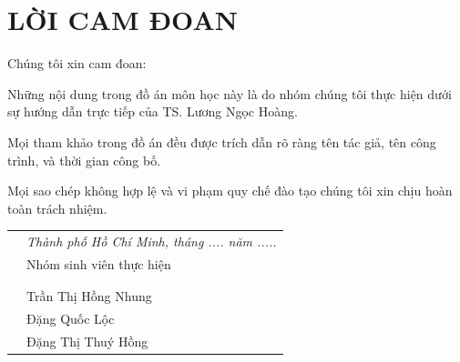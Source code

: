 \chapter*{LỜI CAM ĐOAN}

Chúng tôi xin cam đoan:

Những nội dung trong đồ án môn học này là do nhóm chúng tôi thực hiện dưới sự hướng dẫn trực tiếp của TS. Lương Ngọc Hoàng.

Mọi tham khảo trong đồ án đều được trích dẫn rõ ràng tên tác giả, tên công trình, và thời gian công bố.

Mọi sao chép không hợp lệ và vi phạm quy chế đào tạo chúng tôi xin chịu hoàn toàn trách nhiệm.


{
\begin{table}[ht]
\centering
\begin{tabular}{>{\centering}m{}>{\centering\arraybackslash}m{}}
 & \textit{Thành phố Hồ Chí Minh, tháng .... năm .....} \\
 & Nhóm sinh viên thực hiện \\
 & \\
 & \\
 & Trần Thị Hồng Nhung \\
 & Đặng Quốc Lộc \\
 & Đặng Thị Thuý Hồng
\end{tabular}
\end{table}
}